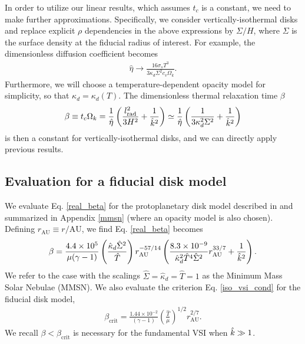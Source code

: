 In order to utilize our linear results, which assumes $t_c$ is a
constant, we need to make further 
approximations. Specifically, we consider vertically-isothermal disks
and replace explicit $\rho$ dependencies in the above expressions by $\Sigma/
H$, where $\Sigma$ is the surface density at the fiducial
radius of interest. For example, the dimensionless diffusion
coefficient becomes 
\begin{align}\label{diff_coeff_dimensionless}
  \hat{\eta} \to  \frac{16\sigma_s T^3}{3\kappa_d\Sigma^2
    c_v\Omega_k}. 
\end{align}
Furthermore, we will choose a temperature-dependent opacity model for
simplicity, so that $\kappa_d=\kappa_d(T)$. The dimensionless thermal
relaxation time $\beta$  
\begin{align}\label{real_beta}
  \beta \equiv t_c\Omega_k =
  \frac{1}{\hat{\eta}}\left(\frac{l_\mathrm{rad}^2}{3H^2}
    + \frac{1}{\hat{k}^2}\right)  \simeq
  \frac{1}{\hat{\eta}}\left(\frac{1}{3\kappa_d^2\Sigma^2} 
    + \frac{1}{\hat{k}^2}\right)
\end{align}
is then a constant for vertically-isothermal disks, 
and we can directly apply previous results. 

\subsection{Evaluation for a fiducial disk model}
We evaluate Eq. \ref{real_beta} for the protoplanetary disk model
described in \cite{chiang10} and summarized in Appendix \ref{mmsn}
(where an opacity model is also chosen). Defining $r_\mathrm{AU}\equiv
r/\mathrm{AU}$, we find Eq. \ref{real_beta} becomes
\begin{align}\label{beta_mmsn}
\beta =
\frac{4.4\times10^5}{\mu(\gamma-1)}\left(\frac{\hat{\kappa}_d\hat{\Sigma}^2}{\hat{T}}\right)r_\mathrm{AU}^{-57/14}\left(\frac{8.3\times10^{-9}}{\hat{\kappa}_d^2\hat{T}^4\hat{\Sigma}^2}r_\mathrm{AU}^{33/7}+\frac{1}{\hat{k}^2}\right).    
\end{align}
We refer to the case with the scalings
$\hat{\Sigma}=\hat{\kappa}_d=\hat{T}=1$ as the Minimum Mass Solar
Nebulae (MMSN).  We also evaluate the criterion Eq. \ref{iso_vsi_cond} for the fiducial
disk model,  
\begin{align}\label{bcrit_mmsn}
  \beta_\mathrm{crit} = \frac{1.44\times10^{-2}}{(\gamma
    -1)}\left(\frac{\hat{T}}{\mu}\right)^{1/2}r_\mathrm{AU}^{2/7}. 
\end{align}
We recall $\beta < \beta_\mathrm{crit}$ is necessary for the
fundamental VSI when $\hat{k}\gg 1$. %

